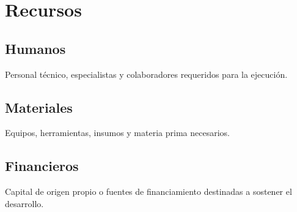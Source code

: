 \section{Recursos}
\label{sec:recursos}

\subsection{Humanos}
Personal técnico, especialistas y colaboradores requeridos para la ejecución.

\subsection{Materiales}
Equipos, herramientas, insumos y materia prima necesarios.

\subsection{Financieros}
Capital de origen propio o fuentes de financiamiento destinadas a sostener el desarrollo.
